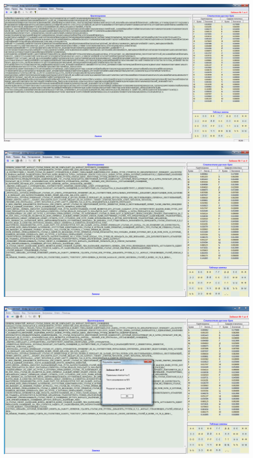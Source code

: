 \documentclass[a4paper,14pt]{extarticle}
\begin{document}
    \begin{center}
        \includegraphics[scale=0.3]{pics/3.png}
    \end{center}
    \begin{center}
        \includegraphics[scale=0.3]{pics/3_1.png}
    \end{center}
    \begin{center}
        \includegraphics[scale=0.3]{pics/3_2.png}
    \end{center}
\end{document}
